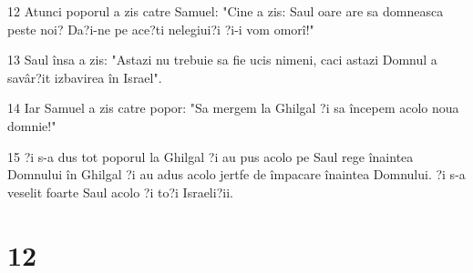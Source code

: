 \par 12 Atunci poporul a zis catre Samuel: "Cine a zis: Saul oare are sa domneasca peste noi? Da?i-ne pe ace?ti nelegiui?i ?i-i vom omorî!"
\par 13 Saul însa a zis: "Astazi nu trebuie sa fie ucis nimeni, caci astazi Domnul a savâr?it izbavirea în Israel".
\par 14 Iar Samuel a zis catre popor: "Sa mergem la Ghilgal ?i sa începem acolo noua domnie!"
\par 15 ?i s-a dus tot poporul la Ghilgal ?i au pus acolo pe Saul rege înaintea Domnului în Ghilgal ?i au adus acolo jertfe de împacare înaintea Domnului. ?i s-a veselit foarte Saul acolo ?i to?i Israeli?ii.

\chapter{12}

